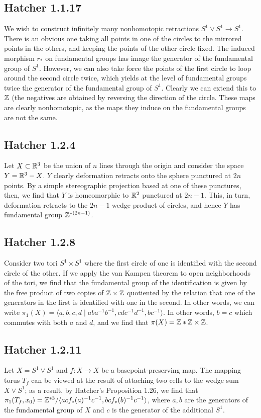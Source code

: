 \documentclass{../mathnotes}
\begin{document}
\subsection*{Hatcher 1.1.17}
We wish to construct infinitely many nonhomotopic retractions $S^1\vee S^1\to S^1$.
There is an obvious one taking all points in one of the circles to the mirrored points in the others,
and keeping the points of the other circle fixed. The induced morphism $r_*$ on fundamental groups
has image the generator of the fundamental group of $S^1$. However, we can also take
force the points of the first circle to loop around the second circle twice, which yields
at the level of fundamental groups twice the generator of the fundamental group of $S^1$.
Clearly we can extend this to $\mathbb{Z}$ (the negatives are obtained by reversing the direction of the
circle. These maps are clearly nonhomotopic, as the maps they induce on the fundamental groups are
not the same.

\subsection*{Hatcher 1.2.4}
Let $X\subset\mathbb{R}^3$ be the union of $n$ lines through the origin and consider the space $Y=\mathbb{R}^3-X$.
$Y$ clearly deformation retracts onto the sphere punctured at $2n$ points. By a simple stereographic
projection based at one of these punctures, then, we find that $Y$ is homeomorphic to $\mathbb{R}^2$ punctured
at $2n-1$. This, in turn, deformation retracts to the $2n-1$ wedge product of circles, and hence $Y$
has fundamental group $\mathbb{Z}^{*(2n-1)}$.

\subsection*{Hatcher 1.2.8}
Consider two tori $S^1\times S^1$ where the first circle of one is identified with the second circle of
the other. If we apply the van Kampen theorem to open neighborhoods of the tori, we find that the fundamental
group of the identification is given by the free product of two copies of $\mathbb{Z}\times\mathbb{Z}$ quotiented by
the relation that one of the generators in the first is identified with one in the second. In other
words, we can write $\pi_1(X)=\langle a,b,c,d\mid aba^{-1}b^{-1}, cdc^{-1}d^{-1}, bc^{-1}\rangle$. In other words,
$b=c$ which commutes with both $a$ and $d$, and we find that $\pi(X)=\mathbb{Z}*\mathbb{Z}\times\mathbb{Z}$.

\subsection*{Hatcher 1.2.11}
Let $X=S^1\vee S^1$ and $f:X\to X$ be a basepoint-preserving map. The mapping torus $T_f$ can be viewed
at the result of attaching two cells to the wedge sum $X\vee S^1$; as a result, by Hatcher's Proposition
1.26, we find that $\pi_1(T_f,x_0)=\mathbb{Z}^{*3}/\langle acf_*(a)^{-1}c^{-1}, bcf_*(b)^{-1}c^{-1}\rangle$, where
$a,b$ are the generators of the fundamental group of $X$ and $c$ is the generator of the additional $S^1$.
\end{document}
